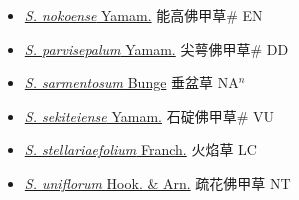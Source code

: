 \begin{itemize}
\begin{itemize}
        \item[] \href{http://www.theplantlist.org/tpl1.1/search?q=Sedum+nokoense}{\textit{S. nokoense} Yamam.}   能高佛甲草\# EN
        \item[] \href{http://www.theplantlist.org/tpl1.1/search?q=Sedum+parvisepalum}{\textit{S. parvisepalum} Yamam.}   尖萼佛甲草\# DD
        \item[] \href{http://www.theplantlist.org/tpl1.1/search?q=Sedum+sarmentosum}{\textit{S. sarmentosum} Bunge}   垂盆草 NA$^n$
        \item[] \href{http://www.theplantlist.org/tpl1.1/search?q=Sedum+sekiteiense}{\textit{S. sekiteiense} Yamam.}   石碇佛甲草\# VU
        \item[] \href{http://www.theplantlist.org/tpl1.1/search?q=Sedum+stellariaefolium}{\textit{S. stellariaefolium} Franch.}   火焰草 LC
        \item[] \href{http://www.theplantlist.org/tpl1.1/search?q=Sedum+uniflorum}{\textit{S. uniflorum} Hook. \& Arn.}   疏花佛甲草 NT
  \end{itemize}
  \end{itemize}
